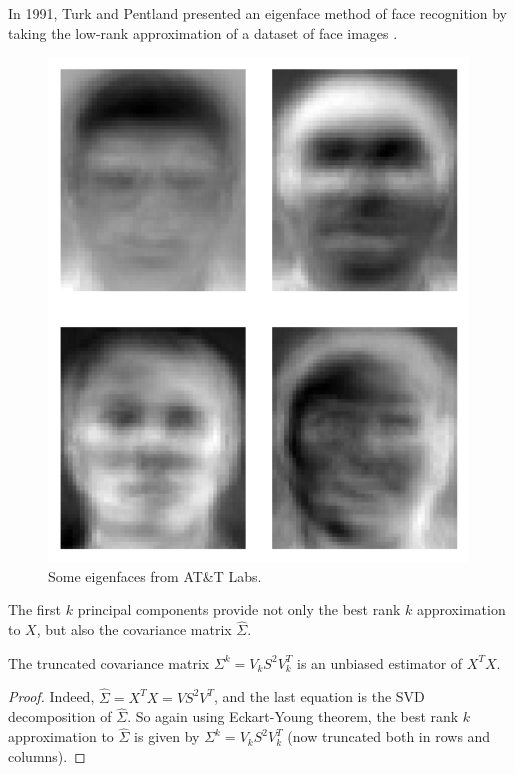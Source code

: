   \begin{example}[Eigenfaces]
    In 1991, Turk and Pentland presented an eigenface method of face recognition by taking the low-rank approximation of a dataset of face images \cite{1991turk}. 

    \begin{figure}[H]
      \centering 
      \includegraphics[scale=0.3]{img/eigenfaces.png}
      \caption{Some eigenfaces from AT\&T Labs. } 
      \label{fig:eigenfaces}
    \end{figure}
  \end{example}

  The first $k$ principal components provide not only the best rank $k$ approximation to $X$, but also the covariance matrix $\hat{\Sigma}$. 

  \begin{theorem}
    The truncated covariance matrix $\Sigma^k = V_k S^2 V_k^T$ is an unbiased estimator of $X^T X$. 
  \end{theorem}
  \begin{proof}
    Indeed, $\hat{\Sigma} = X^T X = V S^2 V^T$, and the last equation is the SVD decomposition of $\hat{\Sigma}$. So again using Eckart-Young theorem, the best rank $k$ approximation to $\hat{\Sigma}$ is given by $\Sigma^k = V_k S^2 V_k^T$ (now truncated both in rows and columns). 
  \end{proof}

